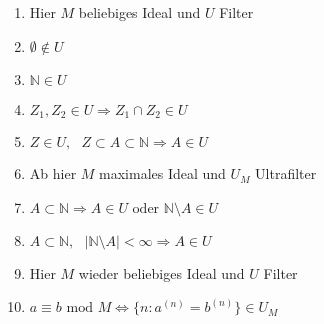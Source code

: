 \documentclass[a4paper]{article}
\begin{document}
\begin{enumerate}
      \item[ ] Hier $ M $ beliebiges Ideal und $ U $ Filter
      \item $ \emptyset \notin U $      
      \item $ \mathbb{N} \in U$ 
      \item $ Z_1, Z_2 \in U \Rightarrow Z_1 \cap Z_2 \in U$ 
      \item $ Z \in U, \text{ } Z \subset A \subset \mathbb{N} \Rightarrow A \in U$ 
      \item[ ] Ab hier $ M $ maximales Ideal und $ U_M $ Ultrafilter
      \item $ A \subset  \mathbb{N} \Rightarrow A \in U \text{ oder } \mathbb{N} \setminus A \in U$ 
      \item $ A \subset  \mathbb{N}, \text{ } |\mathbb{N} \setminus A| < \infty \Rightarrow A \in U$ 
      \item[ ] Hier $ M $ wieder beliebiges Ideal und $ U $ Filter 
      \item $a \equiv b \text{ mod } M \iff \{n: a^{(n)} = b^{(n)}\} \in U_M$
\end{enumerate}
\end{document}
